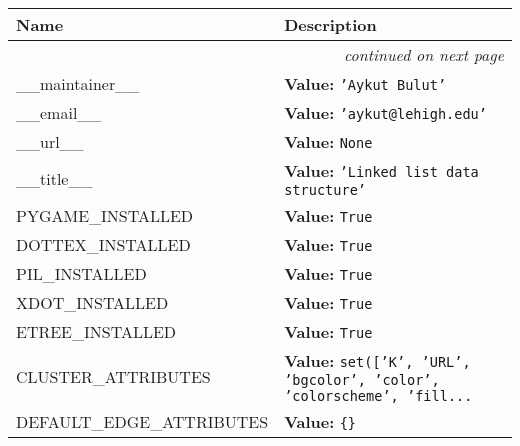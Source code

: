     \vspace{-1cm}
\hspace{\varindent}\begin{longtable}{|p{\varnamewidth}|p{\vardescrwidth}|l}
\cline{1-2}
\cline{1-2} \centering \textbf{Name} & \centering \textbf{Description}& \\
\cline{1-2}
\endhead\cline{1-2}\multicolumn{3}{r}{\small\textit{continued on next page}}\\\endfoot\cline{1-2}
\endlastfoot\raggedright \_\-\_\-m\-a\-i\-n\-t\-a\-i\-n\-e\-r\-\_\-\_\- & \raggedright \textbf{Value:} 
{\tt \texttt{'}\texttt{Aykut Bulut}\texttt{'}}&\\
\cline{1-2}
\raggedright \_\-\_\-e\-m\-a\-i\-l\-\_\-\_\- & \raggedright \textbf{Value:} 
{\tt \texttt{'}\texttt{aykut@lehigh.edu}\texttt{'}}&\\
\cline{1-2}
\raggedright \_\-\_\-u\-r\-l\-\_\-\_\- & \raggedright \textbf{Value:} 
{\tt None}&\\
\cline{1-2}
\raggedright \_\-\_\-t\-i\-t\-l\-e\-\_\-\_\- & \raggedright \textbf{Value:} 
{\tt \texttt{'}\texttt{Linked list data structure}\texttt{'}}&\\
\cline{1-2}
\raggedright P\-Y\-G\-A\-M\-E\-\_\-I\-N\-S\-T\-A\-L\-L\-E\-D\- & \raggedright \textbf{Value:} 
{\tt True}&\\
\cline{1-2}
\raggedright D\-O\-T\-2\-T\-E\-X\-\_\-I\-N\-S\-T\-A\-L\-L\-E\-D\- & \raggedright \textbf{Value:} 
{\tt True}&\\
\cline{1-2}
\raggedright P\-I\-L\-\_\-I\-N\-S\-T\-A\-L\-L\-E\-D\- & \raggedright \textbf{Value:} 
{\tt True}&\\
\cline{1-2}
\raggedright X\-D\-O\-T\-\_\-I\-N\-S\-T\-A\-L\-L\-E\-D\- & \raggedright \textbf{Value:} 
{\tt True}&\\
\cline{1-2}
\raggedright E\-T\-R\-E\-E\-\_\-I\-N\-S\-T\-A\-L\-L\-E\-D\- & \raggedright \textbf{Value:} 
{\tt True}&\\
\cline{1-2}
\raggedright C\-L\-U\-S\-T\-E\-R\-\_\-A\-T\-T\-R\-I\-B\-U\-T\-E\-S\- & \raggedright \textbf{Value:} 
{\tt \texttt{set([}\texttt{'}\texttt{K}\texttt{'}\texttt{, }\texttt{'}\texttt{URL}\texttt{'}\texttt{, }\texttt{'}\texttt{bgcolor}\texttt{'}\texttt{, }\texttt{'}\texttt{color}\texttt{'}\texttt{, }\texttt{'}\texttt{colorscheme}\texttt{'}\texttt{, }\texttt{'}\texttt{fill}\texttt{...}}&\\
\cline{1-2}
\raggedright D\-E\-F\-A\-U\-L\-T\-\_\-E\-D\-G\-E\-\_\-A\-T\-T\-R\-I\-B\-U\-T\-E\-S\- & \raggedright \textbf{Value:} 
{\tt \texttt{\{}\texttt{\}}}&\\

\end{longtable}
